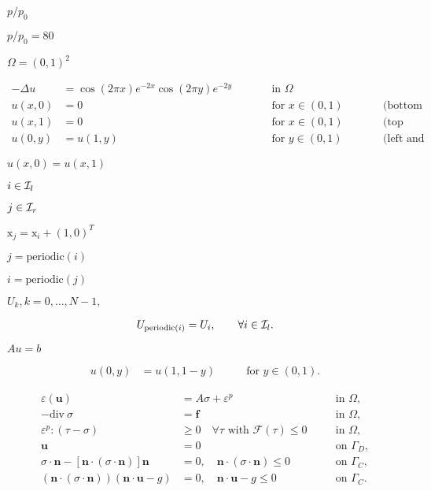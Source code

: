 \documentclass{article}
\begin{document}
$p/p_0$
\pagebreak

$p/p_0=80$
\pagebreak

$\Omega=(0,1)^2$
\pagebreak

\begin{align*} -\Delta u &= \cos(2\pi x)e^{-2x}\cos(2\pi y)e^{-2y} \qquad &&\text{in }\Omega \\ u(x,0) &= 0 \qquad &&\text{for }x\in(0,1)\qquad &&\text{(bottom boundary)} \\ u(x,1) &= 0 \qquad &&\text{for }x\in(0,1)\qquad &&\text{(top boundary)} \\ u(0,y) &= u(1,y) \qquad &&\text{for }y\in(0,1) \qquad && \text{(left and right boundaries)} \end{align*}
\pagebreak

$u(x,0) = u(x,1)$
\pagebreak

$i \in {\cal I}_l$
\pagebreak

$j \in {\cal I}_r$
\pagebreak

${\mathrm x}_j = {\mathrm x}_i + (1,0)^T$
\pagebreak

$j=\text{periodic}(i)$
\pagebreak

$i=\text{periodic}(j)$
\pagebreak

$U_k, k=0,\ldots,N-1,$
\pagebreak

\begin{align*} U_{\text{periodic}(i)} = U_i, \qquad \forall i \in {\cal I}_l. \end{align*}
\pagebreak

$Au=b$
\pagebreak

\begin{align*} u(0,y) &= u(1,1-y) \qquad &\text{for }y\in(0,1). \end{align*}
\pagebreak

\begin{align*} \varepsilon(\mathbf u) &= A\sigma + \varepsilon^p & &\quad\text{in } \Omega,\\ -\textrm{div}\ \sigma &= \mathbf f & &\quad\text{in } \Omega,\\ \varepsilon^p:(\tau - \sigma) &\geq 0\quad\forall\tau\text{ with }\mathcal{F}(\tau)\leq 0 & &\quad\text{in } \Omega,\\ \mathbf u &= 0 & &\quad\text{on }\Gamma_D,\\ \sigma \cdot \mathbf n - [\mathbf n \cdot(\sigma \cdot \mathbf n)]\mathbf n &= 0, \quad \mathbf n \cdot (\sigma \cdot \mathbf n) \leq 0 & &\quad\text{on }\Gamma_C,\\ (\mathbf n \cdot (\sigma \cdot \mathbf n))(\mathbf n \cdot \mathbf u - g) &= 0,\quad \mathbf n \cdot \mathbf u - g \leq 0 & &\quad\text{on } \Gamma_C. \end{align*}
\pagebreak
\end{document}
